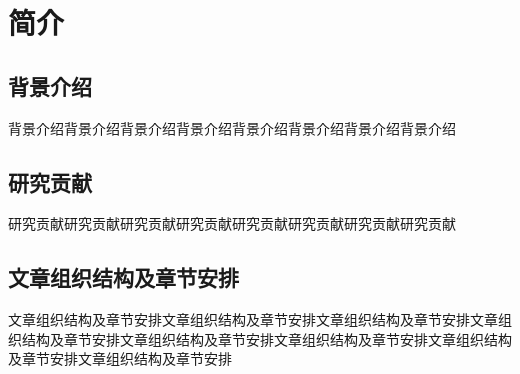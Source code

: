 \section{简介}

\subsection{背景介绍}

背景介绍背景介绍背景介绍背景介绍背景介绍背景介绍背景介绍背景介绍

\subsection{研究贡献}

研究贡献研究贡献研究贡献研究贡献研究贡献研究贡献研究贡献研究贡献

\subsection{文章组织结构及章节安排}

文章组织结构及章节安排文章组织结构及章节安排文章组织结构及章节安排文章组织结构及章节安排文章组织结构及章节安排文章组织结构及章节安排文章组织结构及章节安排文章组织结构及章节安排
